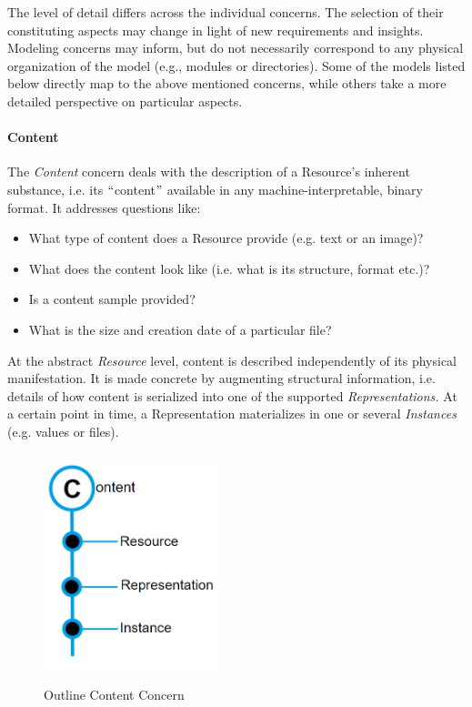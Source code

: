 The level of detail differs across the individual concerns. The selection of their constituting aspects may change in light of new requirements and insights. Modeling concerns may inform, but do not necessarily correspond to any physical organization of the model (e.g., modules or directories). Some of the models listed below directly map to the above mentioned concerns, while others take a more detailed perspective on particular aspects.

\paragraph{Content\\}


The \textit{Content }concern deals with the description of a Resource’s inherent substance, i.e. its $``$content$"$  available in any machine-interpretable, binary format. It addresses questions like: 
 \begin{itemize}
	\item What type of content does a Resource provide (e.g. text or an image)? 
 	\item What does the content look like (i.e. what is its structure, format etc.)? 
 	\item Is a content sample provided? 
 	\item What is the size and creation date of a particular file?
\end{itemize} 

At the abstract \textit{Resource} level, content is described independently of its physical manifestation. It is made concrete by augmenting structural information, i.e. details of how content is serialized into one of the supported \textit{Representations. }At a certain point in time, a Representation materializes in one or several \textit{Instances} (e.g. values or files). \\

\begin{figure}[H]
	\begin{Center}
		\includegraphics[width=2.0in,height=2.61in]{./media/image33.png}
		\caption{Outline Content Concern}
		\label{fig:outline_content_concern}
	\end{Center}
\end{figure}


